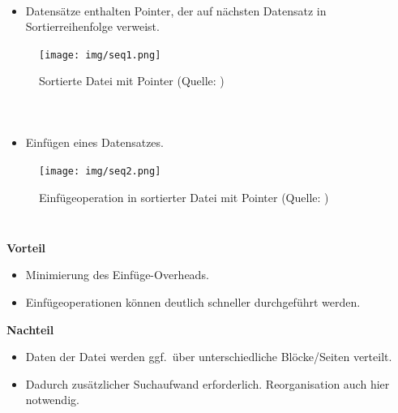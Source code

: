\begin{frame}
\frametitle{\insertsection}
\framesubtitle{\insertsubsection}
\\[4pt]
\begin{itemize}
	\item Datens\"atze enthalten Pointer, der auf n\"achsten Datensatz in Sortierreihenfolge verweist.
\end{itemize}
\begin{center}
\begin{figure}
	\texttt{[image: img/seq1.png]}
	\caption{Sortierte Datei mit Pointer (Quelle: \cite[S. 458]{SKS11})}
\end{figure}
\end{center}
\end{frame}

\begin{frame}
\frametitle{\insertsection}
\framesubtitle{\insertsubsection}	
\\[4pt]
\begin{itemize}
\item Einf\"ugen eines Datensatzes.
\end{itemize}
\begin{center}
\begin{figure}
\texttt{[image: img/seq2.png]}
\caption{Einf\"ugeoperation in sortierter Datei mit Pointer (Quelle: \cite[S. 459]{SKS11})}
\end{figure}
\end{center}
\end{frame}

\begin{frame}
\frametitle{\insertsection}
\framesubtitle{\insertsubsection}
\\[4pt]
\textbf{Vorteil}
\begin{itemize}
\item Minimierung des Einf\"uge-Overheads.
\item Einf\"ugeoperationen k\"onnen deutlich schneller durchgef\"uhrt werden.
\end{itemize}
\abs
\pause
\textbf{Nachteil}
\begin{itemize}
\item Daten der Datei werden ggf.~\"uber unterschiedliche Bl\"ocke/Seiten verteilt.
\item Dadurch zusätzlicher Suchaufwand erforderlich. Reorganisation auch hier notwendig.
\end{itemize}
\end{frame}

